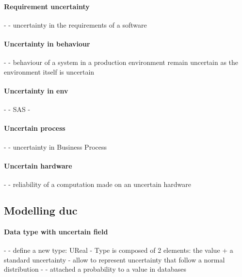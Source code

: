 \paragraph{Requirement uncertainty}
- \cite{DBLP:journals/re/WhittleSBCB10, DBLP:conf/re/WhittleSBCB09, DBLP:journals/re/SalayCHS13}
	- uncertainty in the requirements of a software

\paragraph{Uncertainty in \gls{behaviour}}
- \cite{DBLP:journals/sosym/Zhang00NO19}
	- behaviour of a system in a production environment remain uncertain as the environment itself is uncertain
	
\paragraph{Uncertainty in \gls{env}}
- \cite{DBLP:conf/dagstuhl/EsfahaniM10}
	- SAS
- \cite{DBLP:conf/ecmdafa/ZhangSAYON16}
	
\paragraph{Uncertain process}
- \cite{DBLP:journals/infsof/Jimenez-RamirezW0V15}
	- uncertainty in Business Process
	
\paragraph{Uncertain hardware}
- \cite{DBLP:conf/oopsla/CarbinMR13}
	- reliability of a computation made on an uncertain hardware
	
\subsection[Modelling data uncertainty]{Modelling \gls{duc}}

\paragraph{Data type with uncertain field}
- \cite{DBLP:conf/models/BurguenoBMV18, DBLP:conf/ecmdafa/BertoaMBBTV18, DBLP:conf/sle/MayerhoferWV16, DBLP:conf/quatic/VallecilloMO16}
	- define a new type: UReal
	- Type is composed of 2 elements: the value + a standard uncertainty
	- allow to represent uncertainty that follow a normal distribution
- \cite{DBLP:journals/tkde/BarbaraGP92}
	- attached a probability to a value in databases

